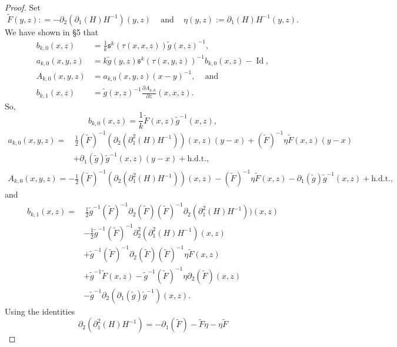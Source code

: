\documentclass{amsart}
\theoremstyle{definition}
\theoremstyle{remark}
\numberwithin{equation}{section}
\newcommand{\deriv}[2]{\frac{\partial #1}{\partial #2}}
\DeclareMathOperator{\Id}{Id}
\begin{document}
\begin{proof}
Set
$$
\tilde{F}(y,z) : = - \partial_2 (\partial_1 (H) H^{-1}) (y,z)
\hspace{10pt} \text{ and } \hspace{10pt}
\eta(y,z) := \partial_1 (H) H^{-1} (y,z).
$$
We have shown in \S5 that
\begin{align*}
b_{k,0}(x,z) & = \frac{1}{k} \mathfrak{s}^k(\tau(x,x,z)) \tilde{g}(x,z)^{-1}, \\
a_{k,0}(x,y,z) & = k\tilde{g}(y,z) \mathfrak{s}^k(\tau(x,y,z))^{-1} b_{k,0}(x,z) - \Id, \\
A_{k,0}(x,y,z) & = a_{k,0}(x,y,z) (x-y)^{-1}, \hspace{10pt} \text{ and } \\
b_{k,1}(x,z) & = \tilde{g}(x,z)^{-1} \deriv{A_{k,0}}{z}(x,x,z).
\end{align*}
So,
$$
b_{k,0}(x,z) = \frac{1}{k} \tilde{F}(x,z) \tilde{g}^{-1}(x,z),
$$
\begin{align*}
a_{k,0}(x,y,z) = & \hspace{2pt} \frac{1}{2} (\tilde{F})^{-1} (\partial_2(\partial_1^2(H)H^{-1}))(x,z) (y-x) + (\tilde{F})^{-1} \eta \tilde{F} (x,z)(y-x) \\
    &  +  \partial_1 (\tilde{g})\tilde{g}^{-1} (x,z)(y-x) + \text{h.d.t.},
\end{align*}
\begin{align*}
A_{k,0}(x,y,z) =  -\frac{1}{2} (\tilde{F})^{-1} (\partial_2(\partial_1^2(H)H^{-1}))(x,z) - (\tilde{F})^{-1} \eta \tilde{F} (x,z) -  \partial_1 (\tilde{g})\tilde{g}^{-1} (x,z)  + \text{h.d.t.},
\end{align*}
and
\begin{align*}
b_{k,1}(x,z) = & \hspace{2pt}   \frac{1}{2} \tilde{g}^{-1}  (\tilde{F})^{-1} \partial_2 (\tilde{F})(\tilde{F})^{-1} \partial_2(\partial_1^2(H)H^{-1}))  (x,z)\\
    & -\frac{1}{2} \tilde{g}^{-1}  (\tilde{F})^{-1}  \partial_2^2 (\partial_1^2(H)H^{-1})  (x,z) \\
    & + \tilde{g}^{-1} (\tilde{F})^{-1} \partial_2 (\tilde{F})(\tilde{F})^{-1} \eta \tilde{F} (x,z) \\
    & + \tilde{g}^{-1} \tilde{F} (x,z) - \tilde{g}^{-1} (\tilde{F})^{-1}\eta \partial_2 (\tilde{F})(x,z) \\
    & - \tilde{g}^{-1} \partial_2 ( \partial_1 (\tilde{g})\tilde{g}^{-1})(x,z) .
\end{align*}
Using the identities
\begin{equation*}
    \partial_2(\partial_1^2(H)H^{-1}) = -\partial_1 (\tilde{F}) - \tilde{F} \eta - \eta \tilde{F}

\end{equation*}
\end{proof}
\end{document}
